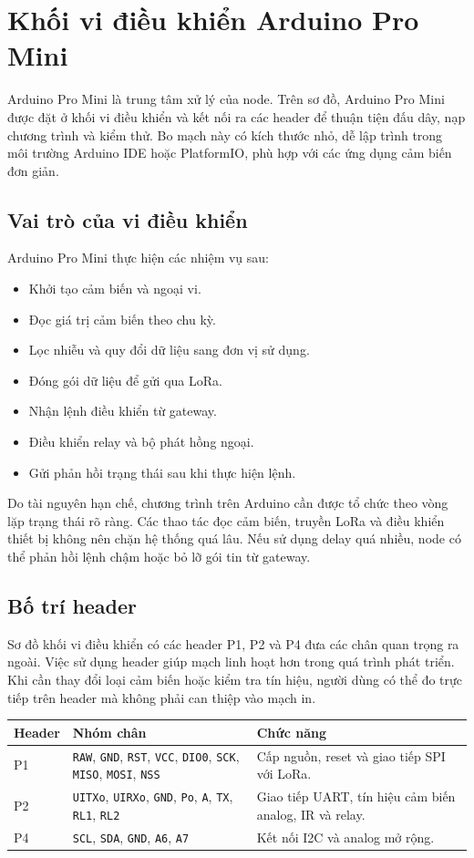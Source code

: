 \section{Khối vi điều khiển Arduino Pro Mini}
Arduino Pro Mini là trung tâm xử lý của node. Trên sơ đồ, Arduino Pro Mini được đặt ở khối vi điều khiển và kết nối ra các header để thuận tiện đấu dây, nạp chương trình và kiểm thử. Bo mạch này có kích thước nhỏ, dễ lập trình trong môi trường Arduino IDE hoặc PlatformIO, phù hợp với các ứng dụng cảm biến đơn giản.

\subsection{Vai trò của vi điều khiển}
Arduino Pro Mini thực hiện các nhiệm vụ sau:
\begin{itemize}
    \item Khởi tạo cảm biến và ngoại vi.
    \item Đọc giá trị cảm biến theo chu kỳ.
    \item Lọc nhiễu và quy đổi dữ liệu sang đơn vị sử dụng.
    \item Đóng gói dữ liệu để gửi qua LoRa.
    \item Nhận lệnh điều khiển từ gateway.
    \item Điều khiển relay và bộ phát hồng ngoại.
    \item Gửi phản hồi trạng thái sau khi thực hiện lệnh.
\end{itemize}

Do tài nguyên hạn chế, chương trình trên Arduino cần được tổ chức theo vòng lặp trạng thái rõ ràng. Các thao tác đọc cảm biến, truyền LoRa và điều khiển thiết bị không nên chặn hệ thống quá lâu. Nếu sử dụng delay quá nhiều, node có thể phản hồi lệnh chậm hoặc bỏ lỡ gói tin từ gateway.

\subsection{Bố trí header}
Sơ đồ khối vi điều khiển có các header P1, P2 và P4 đưa các chân quan trọng ra ngoài. Việc sử dụng header giúp mạch linh hoạt hơn trong quá trình phát triển. Khi cần thay đổi loại cảm biến hoặc kiểm tra tín hiệu, người dùng có thể đo trực tiếp trên header mà không phải can thiệp vào mạch in.

\begin{longtable}{|p{3cm}|p{4.2cm}|p{5.5cm}|}
\hline
\textbf{Header} & \textbf{Nhóm chân} & \textbf{Chức năng} \\
\hline
P1 & \texttt{RAW}, \texttt{GND}, \texttt{RST}, \texttt{VCC}, \texttt{DIO0}, \texttt{SCK}, \texttt{MISO}, \texttt{MOSI}, \texttt{NSS} & Cấp nguồn, reset và giao tiếp SPI với LoRa. \\
\hline
P2 & \texttt{UITXo}, \texttt{UIRXo}, \texttt{GND}, \texttt{Po}, \texttt{A}, \texttt{TX}, \texttt{RL1}, \texttt{RL2} & Giao tiếp UART, tín hiệu cảm biến analog, IR và relay. \\
\hline
P4 & \texttt{SCL}, \texttt{SDA}, \texttt{GND}, \texttt{A6}, \texttt{A7} & Kết nối I2C và analog mở rộng. \\
\hline
\end{longtable}

